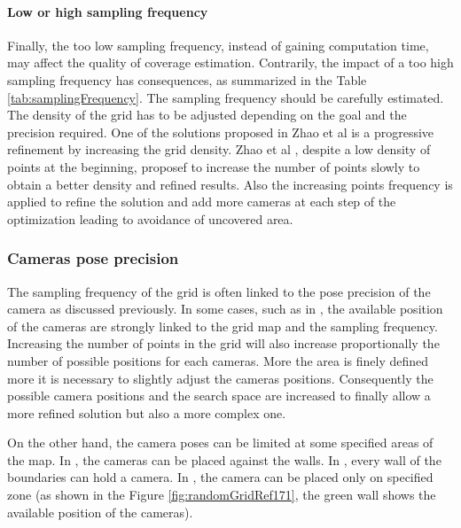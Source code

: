 \paragraph*{Low or high sampling frequency}
Finally, the too low sampling frequency, instead of gaining computation time, may affect the quality of coverage  estimation. Contrarily, the impact of a too high sampling frequency has consequences, as summarized in the Table \ref{tab:samplingFrequency}. The sampling frequency should be carefully estimated. \\
The density of the grid has to be adjusted depending on the goal and the precision required. One of the solutions proposed in Zhao et al \citep{22*zhao2008} is a progressive refinement by increasing the grid density.
Zhao et al \citep{22*zhao2008}, despite a low density of points at the beginning,  proposef to increase the number of points slowly to obtain a better density and refined results. Also the increasing points frequency is applied to refine the solution and add more cameras at each step of the optimization leading to avoidance of uncovered area.  \\


\subsubsection{Cameras pose precision}
The sampling frequency  of the grid is often linked to the pose precision of the camera as discussed previously. In some cases, such as in  \citep{83*van2009,150*chakrabarty2002,195*choi2009,87*morsly2012}, the available position of the cameras are strongly linked to the grid map and the sampling frequency.
Increasing the number of points in the grid will also increase proportionally the number of possible positions for each cameras. More the area is finely defined more it is necessary to slightly adjust the cameras positions. Consequently the possible camera positions and the search space are increased to finally allow a more refined solution but also a more complex one.

On the other hand, the camera poses can be limited at some specified areas of the map. In \citep{171*horster2006,22*zhao2008}, the cameras can be placed against the walls. In \cite{22*zhao2008}, every wall  of the boundaries can hold a camera. In \cite{171*horster2006}, the camera can be placed only on specified zone (as shown in the Figure \ref{fig:randomGridRef171}, the green wall shows the available position of the cameras).

